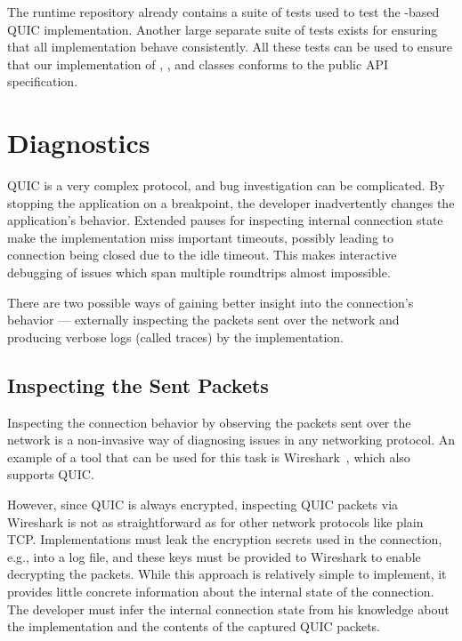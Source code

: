 The \dotnet{} runtime repository already contains a suite of tests used to test the
\libmsquic{}-based QUIC implementation. Another large separate suite of tests exists for ensuring
that all  implementation behave consistently. All these tests can be used to ensure
that our implementation of \QuicListener{}, \QuicConnection{}, and \QuicStream{} classes conforms to
the public API specification.

\section{Diagnostics}

QUIC is a very complex protocol, and bug investigation can be complicated. By stopping the
application on a breakpoint, the developer inadvertently changes the application's behavior.
Extended pauses for inspecting internal connection state make the implementation miss important
timeouts, possibly leading to connection being closed due to the idle timeout. This makes
interactive debugging of issues which span multiple roundtrips almost impossible.

There are two possible ways of gaining better insight into the connection's behavior --- externally
inspecting the packets sent over the network and producing verbose logs (called traces) by the
implementation.

\subsection{Inspecting the Sent Packets}

Inspecting the connection behavior by observing the packets sent over the network is a non-invasive
way of diagnosing issues in any networking protocol. An example of a tool that can be used for this
task is Wireshark~\cite{web:wireshark}, which also supports QUIC\@.

However, since QUIC is always encrypted, inspecting QUIC packets via Wireshark is not as
straightforward as for other network protocols like plain TCP\@. Implementations must leak the
encryption secrets used in the connection, e.g., into a log file, and these keys must be provided to
Wireshark to enable decrypting the packets. While this approach is relatively simple to implement,
it provides little concrete information about the internal state of the connection. The developer
must infer the internal connection state from his knowledge about the implementation and the
contents of the captured QUIC packets.


